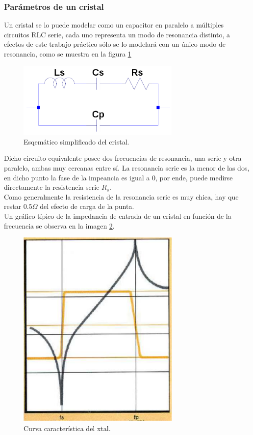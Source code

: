 \documentclass[a4paper,10pt]{article}
\begin{document}
		\subsubsection{Par\'ametros de un cristal}	
		
		\indent Un cristal se lo puede modelar como un capacitor en paralelo a 
		múltiples circuitos RLC serie, cada uno representa un modo de resonancia
		distinto, a efectos de este trabajo práctico sólo se lo modelará con un 
		único modo de resonancia, como se muestra en la figura \ref{img004}

		\begin{figure}[!htb]
			\centering
			\includegraphics[width=8cm]{Imagenes/esqXtal.png}
			\caption{Esqemático simplificado del cristal.}
			\label{img004} 
		\end{figure}

		\indent Dicho circuito equivalente posee dos frecuencias de resonancia,
		una serie y otra paralelo, ambas muy cercanas entre sí. La resonancia 
		serie es la menor de las dos, en dicho punto la fase de la impeancia es
		igual a 0, por ende, puede medirse directamente la resistencia serie 
		$R_s$. \\
		\indent Como generalmente la resistencia de la resonancia serie es muy 
		chica, hay que restar $0.5\Omega$ del efecto de carga de la punta. \\
		\indent Un gráfico típico de la impedancia de entrada de un cristal en 
		función de la frecuencia se observa en la imagen \ref{img005}.
		
		\begin{figure}[!htb]
			\centering
			\includegraphics[width=8cm]{Imagenes/curvaCaractXtal.png}
			\caption{Curva característica del xtal.}
			\label{img005} 
		\end{figure}
\end{document}
